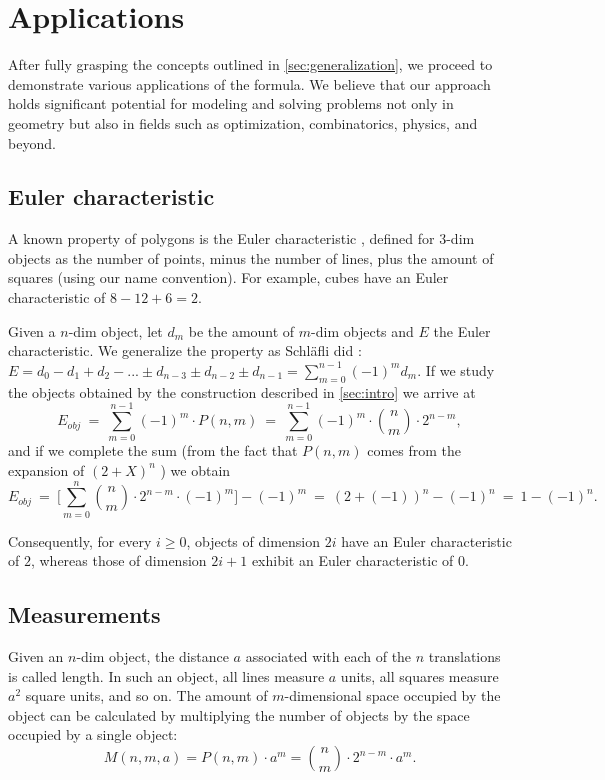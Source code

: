 \documentclass{article}
\begin{document}
	\section{Applications \label{sec:apps}}
	
	After fully grasping the concepts outlined in \autoref{sec:generalization}, we proceed to demonstrate various applications of the formula. We believe that our approach holds significant potential for modeling and solving problems not only in geometry but also in fields such as optimization, combinatorics, physics, and beyond.
	
	\subsection{Euler characteristic \label{sec:euler}}
	
	A known property of polygons is the Euler characteristic \cite{euler}, defined for $3$-dim objects as the number of points, minus the number of lines, plus the amount of squares (using our name convention). For example, cubes have an Euler characteristic of $8 - 12 + 6 = 2$.

	Given a $n$-dim object, let $d_m$ be the amount of $m$-dim objects and $E$ the Euler characteristic. We generalize the property as Schläfli did \cite{coxeter1973regular}: $E=d_{0}-d_{1}+d_{2}- ... \pm d_{n-3}\pm d_{n-2}\pm d_{n-1} = \sum_{m=0}^{n-1}(-1)^{m}d_{m}$. If we study the objects obtained by the construction described in \autoref{sec:intro} we arrive at
	$$E_{obj} \ = \ \sum_{m=0}^{n-1}(-1)^{m} \cdot P(n,m)\ =\ \sum_{m=0}^{n-1}(-1)^{m} \cdot \binom{n}{m} \cdot 2^{n-m},$$
	and if we complete the sum (from the fact that $P(n,m)$ comes from the expansion of $(2 + X)^{n}$ \cite{coxeter1973regular}) we obtain
	$$E_{obj} \ =\ \Bigg[\sum_{m=0}^{n} \binom{n}{m} \cdot 2^{n-m} \cdot (-1)^{m}\Bigg] - (-1)^m \ = \ (2 + (-1))^{n}-(-1)^{n} \ = \ 1-(-1)^{n}.$$
	
	Consequently, for every $i \geq 0$, objects of dimension $2i$ have an Euler characteristic of $2$, whereas those of dimension $2i+1$ exhibit an Euler characteristic of $0$.
	
	\subsection{Measurements}
	
	Given an $n$-dim object, the distance $a$ associated with each of the $n$ translations is called length. In such an object, all lines measure $a$ units, all squares measure $a^{2}$ square units, and so on. The amount of $m$-dimensional space occupied by the object can be calculated by multiplying the number of objects by the space occupied by a single object:
	$$M(n,m,a) = P(n,m) \cdot a^{m} = \binom{n}{m} \cdot 2^{n-m} \cdot a^{m}.$$
	
\end{document}
